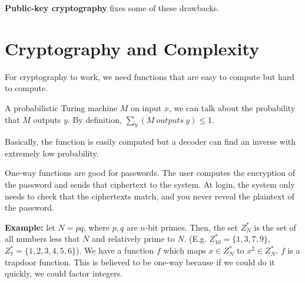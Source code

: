 \textbf{Public-key cryptography} fixes some of these drawbacks.  


\section*{Cryptography and Complexity}

For cryptography to work, we need functions that are easy to compute but hard to compute.




A probabilistic Turing machine $M$ on input $x$, we can talk about the probability that $M$ outputs $y$.  By definition, $\sum\limits_y (M \ outputs \ y)\leq 1$.


Basically, the function is easily computed but a decoder can find an inverse with extremely low probability.

One-way functions are good for passwords.  The user computes the encryption of the password and sends that ciphertext to the system.  At login, the system only needs to check that the ciphertexts match, and you never reveal the plaintext of the password.


\textbf{Example:} let $N=pq$, where $p,q$ are $n$-bit primes.  Then, the set $Z_N^*$ is the set of all numbers less that $N$ and relatively prime to $N$. (E.g. $Z_{10}^*=\{1,3,7,9\}$, $Z_7^*=\{1,2,3,4,5,6\}$).  We have a function $f$ which maps $x\in Z_N^*$ to $x^2\in Z_N^*$.  $f$ is a trapdoor function.  This is believed to be one-way because if we could do it quickly, we could factor integers.


